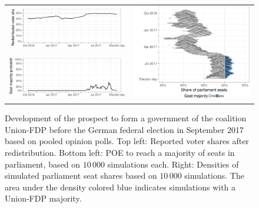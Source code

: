 \documentclass[smallcondensed]{svjour3}     %
\begin{document}
\begin{figure}[H]\centering
\begin{tabular}{ll}
\includegraphics[height=.15\textwidth]{figures/2017_pooled_cdufdp_rawSharesRedist.pdf}
&
\multirow{2}{*}[13ex]{\includegraphics[height=30ex]{figures/2017_pooled_cdufdp_ridgeline.pdf}}
\\
\includegraphics[height=.15\textwidth]{figures/2017_pooled_cdufdp_prob.pdf}
\end{tabular}
\caption{Development of the prospect to form a government of the coalition
Union-FDP before the German federal election in September 2017 based on pooled
opinion polls.
Top left: Reported voter shares after redistribution.
Bottom left: POE to reach a majority of seats in parliament, based on
$10\,000$ simulations each.
Right: Densities of simulated parliament seat shares based on $10\,000$ simulations.
The area under the density colored blue indicates simulations with a
Union-FDP majority.
\label{fig:2017_cdufdp}
}
\end{figure}

\end{document}
